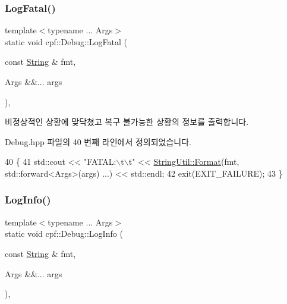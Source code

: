 \subsubsection{\texorpdfstring{Log\+Fatal()}{LogFatal()}}
{\footnotesize\ttfamily template$<$typename ... Args$>$ \\
static void cpf\+::\+Debug\+::\+Log\+Fatal (\begin{DoxyParamCaption}\item[{const \hyperlink{namespacecpf_a4dbd6992c3ed4440ce7ed8982ff7ffea}{String} \&}]{fmt,  }\item[{Args \&\&...}]{args }\end{DoxyParamCaption})\hspace{0.3cm}{\ttfamily [inline]}, {\ttfamily [static]}}

비정상적인 상황에 맞닥쳤고 복구 불가능한 상황의 정보를 출력합니다. 

Debug.\+hpp 파일의 40 번째 라인에서 정의되었습니다.


\begin{DoxyCode}
40                                                                \{
41             std::cout << \textcolor{stringliteral}{"FATAL:\(\backslash\)t\(\backslash\)t"} << \hyperlink{classcpf_1_1_string_util_a965cca44ea396f01f2f3c5e3851f1001}{StringUtil::Format}(fmt, std::forward<Args>(args)
      ...) << std::endl;
42             exit(EXIT\_FAILURE);
43         \}
\end{DoxyCode}
\mbox{\label{classcpf_1_1_debug_a4fdb5fd97498bef70585fcac8047efa2}} 
\subsubsection{\texorpdfstring{Log\+Info()}{LogInfo()}}
{\footnotesize\ttfamily template$<$typename ... Args$>$ \\
static void cpf\+::\+Debug\+::\+Log\+Info (\begin{DoxyParamCaption}\item[{const \hyperlink{namespacecpf_a4dbd6992c3ed4440ce7ed8982ff7ffea}{String} \&}]{fmt,  }\item[{Args \&\&...}]{args }\end{DoxyParamCaption})\hspace{0.3cm}{\ttfamily [inline]}, {\ttfamily [static]}}



